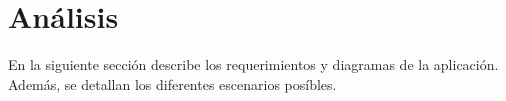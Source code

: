 \chapter{Análisis } %
En la siguiente sección describe los requerimientos y diagramas de la aplicación. Además, se detallan los diferentes escenarios posíbles.
	